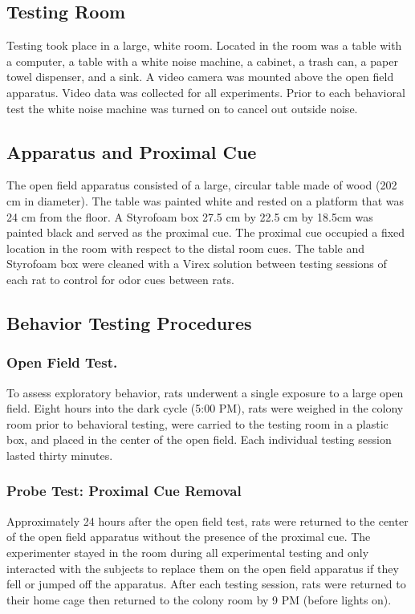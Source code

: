 \documentclass[fleqn,10pt]{wlscirep}
\begin{document}
\subsection*{Testing Room}
	Testing took place in a large, white room. Located in the room was a table with a computer, a table with a white noise machine, a cabinet, a trash can, a paper towel dispenser, and a sink. A video camera was mounted above the open field apparatus. Video data was collected for all experiments. Prior to each behavioral test the white noise machine was turned on to cancel out outside noise.

\subsection*{Apparatus and Proximal Cue}
	The open field apparatus consisted of a large, circular table made of wood (202 cm in diameter). The table was painted white and rested on a platform that was 24 cm from the floor. A Styrofoam box 27.5 cm by 22.5 cm by 18.5cm was painted black and served as the proximal cue. The proximal cue occupied a fixed location in the room with respect to the distal room cues. The table and Styrofoam box were cleaned with a Virex solution between testing sessions of each rat to control for odor cues between rats.

\subsection*{Behavior Testing Procedures}
\subsubsection*{Open Field Test.}To assess exploratory behavior, rats underwent a single exposure to a large open field. Eight hours into the dark cycle (5:00 PM), rats were weighed in the colony room prior to behavioral testing, were carried to the testing room in a plastic box, and placed in the center of the open field. Each individual testing session lasted thirty minutes. 
\subsubsection*{Probe Test: Proximal Cue Removal} Approximately 24 hours after the open field test, rats were returned to the center of the open field apparatus without the presence of the proximal cue. 
The experimenter stayed in the room during all experimental testing and only interacted with the subjects to replace them on the open field apparatus if they fell or jumped off the apparatus. After each testing session, rats were returned to their home cage then returned to the colony room by 9 PM (before lights on).
\end{document}
